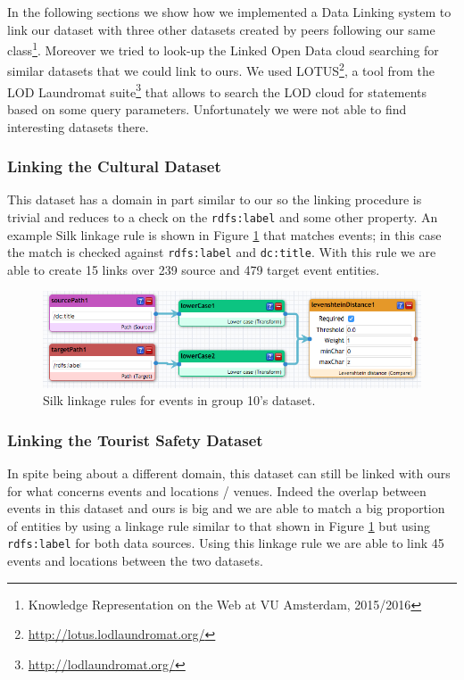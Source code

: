 \documentclass[runningheads,a4paper]{../../StyleFiles/llncs}
\begin{document}
In the following sections we show how we implemented a Data Linking system to
link our dataset with three other datasets created by peers following our same
class\footnote{Knowledge Representation on the Web at VU Amsterdam, 2015/2016}.
Moreover we tried to look-up the Linked Open Data cloud searching for similar
datasets that we could link to ours. We used
LOTUS\footnote{\url{http://lotus.lodlaundromat.org/}}, a tool from the LOD
Laundromat suite\footnote{\url{http://lodlaundromat.org/}}\cite{beek2014lod}
that allows to search the LOD cloud for statements based on some query
parameters. Unfortunately we were not able to find interesting datasets there.

\subsubsection{Linking the Cultural Dataset}
This dataset has a domain in part similar to our so the linking procedure
is trivial and reduces to a check on the \texttt{rdfs:label} and some other
property. An example Silk linkage rule is shown in Figure \ref{fig:link_event_g10}
that matches events; in this case the match is checked against
\texttt{rdfs:label} and \texttt{dc:title}. With this rule we are able to create
15 links over 239 source and 479 target event entities.

\begin{figure}[h]
	\centering
	\includegraphics[width=1\textwidth]{img/link_event_g10.png}
	\caption{Silk linkage rules for events in group 10's dataset.}
	\label{fig:link_event_g10}
\end{figure}

\subsubsection{Linking the Tourist Safety Dataset}
In spite being about a different domain, this dataset can still be linked with
ours for what concerns events and locations / venues. Indeed the overlap between
events in this dataset and ours is big and we are able to match a big proportion
of entities by using a linkage rule similar to that shown in Figure
\ref{fig:link_event_g10} but using \texttt{rdfs:label} for both data sources.
Using this linkage rule we are able to link 45 events and locations between the
two datasets.
\end{document}

